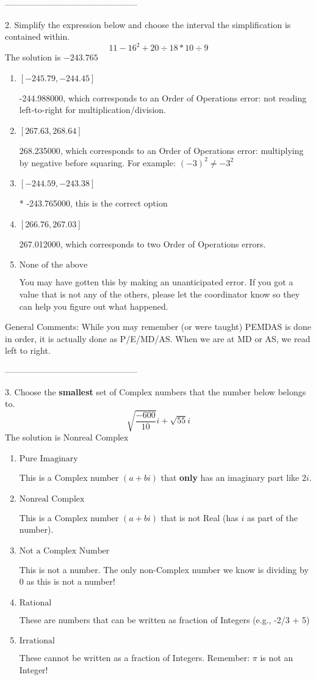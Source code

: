 \documentclass{article}[14pt]
\begin{document}
-----------------------------------------------

2. Simplify the expression below and choose the interval the simplification is contained within.
$$ 11 - 16^2 + 20 \div 18 * 10 \div 9 $$ 
The solution is $ -243.765 $ 

\begin{enumerate}[label=\Alph*.] 
\item $ [-245.79, -244.45] $ 

  -244.988000, which corresponds to an Order of Operations error: not reading left-to-right for multiplication/division. 
\item $ [267.63, 268.64] $ 

  268.235000, which corresponds to an Order of Operations error: multiplying by negative before squaring. For example: $(-3)^2 \neq -3^2$ 
\item $ [-244.59, -243.38] $ 

 * -243.765000, this is the correct option 
\item $ [266.76, 267.03] $ 

  267.012000, which corresponds to two Order of Operations errors. 
\item $ \text{None of the above} $ 

  You may have gotten this by making an unanticipated error. If you got a value that is not any of the others, please let the coordinator know so they can help you figure out what happened. 
\end{enumerate} 
 
General Comments: While you may remember (or were taught) PEMDAS is done in order, it is actually done as P/E/MD/AS. When we are at MD or AS, we read left to right.

-----------------------------------------------

3. Choose the \textbf{smallest} set of Complex numbers that the number below belongs to.
$$ \sqrt{\frac{-600}{10}} i+\sqrt{55}i $$ 
The solution is $ \text{Nonreal Complex} $ 

\begin{enumerate}[label=\Alph*.] 
\item $ \text{Pure Imaginary} $ 

 This is a Complex number $(a+bi)$ that \textbf{only} has an imaginary part like $2i$. 
\item $ \text{Nonreal Complex} $ 

 This is a Complex number $(a+bi)$ that is not Real (has $i$ as part of the number). 
\item $ \text{Not a Complex Number} $ 

 This is not a number. The only non-Complex number we know is dividing by 0 as this is not a number! 
\item $ \text{Rational} $ 

 These are numbers that can be written as fraction of Integers (e.g., -2/3 + 5) 
\item $ \text{Irrational} $ 

 These cannot be written as a fraction of Integers. Remember: $\pi$ is not an Integer! 
\end{enumerate} 
 
\end{document}
